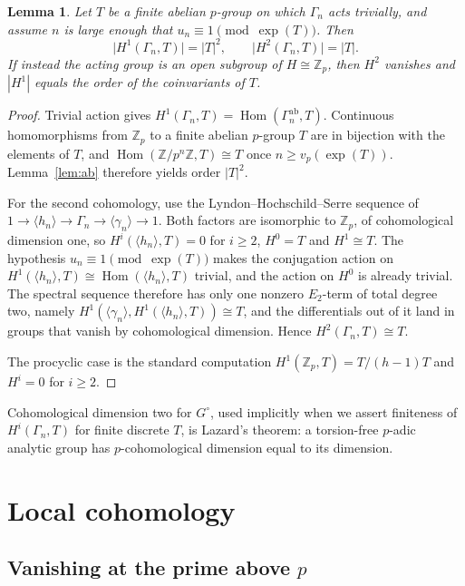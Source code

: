 \documentclass[11pt]{article}
\newtheorem{lemma}[theorem]{Lemma}
\theoremstyle{definition}
\theoremstyle{remark}
\newcommand{\Z}{\mathbb{Z}}
\newcommand{\Hom}{\operatorname{Hom}}
\newcommand{\Gp}{G^{\circ}}
\begin{document}
\begin{lemma}
\label{lem:cohfinite}
Let \(T\) be a finite abelian \(p\)-group on which \(\Gamma_n\) acts trivially, and assume \(n\) is large enough that \(u_n\equiv 1\pmod{\exp(T)}\). Then
\[
\bigl|H^1(\Gamma_n,T)\bigr|=|T|^2,\qquad \bigl|H^2(\Gamma_n,T)\bigr|=|T|.
\]
If instead the acting group is an open subgroup of \(H\cong\Z_p\), then \(H^2\) vanishes and \(|H^1|\) equals the order of the coinvariants of \(T\).
\end{lemma}

\begin{proof}
Trivial action gives \(H^1(\Gamma_n,T)=\Hom(\Gamma_n^{\mathrm{ab}},T)\). Continuous homomorphisms from \(\Z_p\) to a finite abelian \(p\)-group \(T\) are in bijection with the elements of \(T\), and \(\Hom(\Z/p^n\Z,T)\cong T\) once \(n\ge v_p(\exp(T))\). Lemma~\ref{lem:ab} therefore yields order \(|T|^2\).

For the second cohomology, use the Lyndon--Hochschild--Serre sequence of \(1\to\langle h_n\rangle\to\Gamma_n\to\langle\gamma_n\rangle\to 1\). Both factors are isomorphic to \(\Z_p\), of cohomological dimension one, so \(H^i(\langle h_n\rangle,T)=0\) for \(i\ge 2\), \(H^0=T\) and \(H^1\cong T\). The hypothesis \(u_n\equiv 1\pmod{\exp(T)}\) makes the conjugation action on \(H^1(\langle h_n\rangle,T)\cong\Hom(\langle h_n\rangle,T)\) trivial, and the action on \(H^0\) is already trivial. The spectral sequence therefore has only one nonzero \(E_2\)-term of total degree two, namely \(H^1(\langle\gamma_n\rangle,H^1(\langle h_n\rangle,T))\cong T\), and the differentials out of it land in groups that vanish by cohomological dimension. Hence \(H^2(\Gamma_n,T)\cong T\).

The procyclic case is the standard computation \(H^1(\Z_p,T)=T/(h-1)T\) and \(H^i=0\) for \(i\ge 2\).
\end{proof}

Cohomological dimension two for \(\Gp\), used implicitly when we assert finiteness of \(H^i(\Gamma_n,T)\) for finite discrete \(T\), is Lazard's theorem: a torsion-free \(p\)-adic analytic group has \(p\)-cohomological dimension equal to its dimension.

\section{Local cohomology}
\label{sec:local}

\subsection{Vanishing at the prime above \(p\)}
\end{document}
